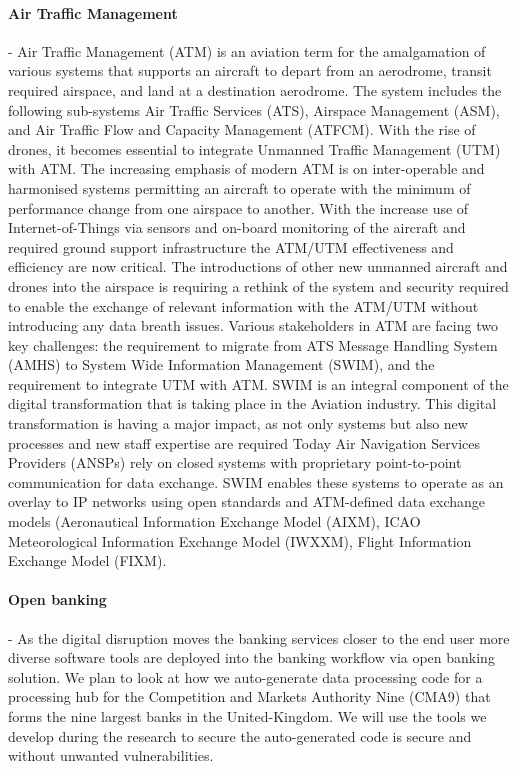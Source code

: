 \documentclass[a4paper,11pt]{article}
\begin{document}
\paragraph{Air Traffic Management}
\label{sec:atm}
- Air Traffic Management (ATM) is an aviation term for the amalgamation of various systems that supports an aircraft to depart from an aerodrome, transit required airspace, and land at a destination aerodrome. The system includes the following sub-systems Air Traffic Services (ATS), Airspace Management (ASM), and Air Traffic Flow and Capacity Management (ATFCM). With the rise of drones, it becomes essential to integrate Unmanned Traffic Management (UTM) with ATM. The increasing emphasis of modern ATM is on inter-operable and harmonised systems permitting an aircraft to operate with the minimum of performance change from one airspace to another. With the increase use of Internet-of-Things via sensors and on-board monitoring of the aircraft and required ground support infrastructure the ATM/UTM effectiveness and efficiency are now critical. The introductions of other new unmanned aircraft and drones into the airspace is requiring a rethink of the system and security required to enable the exchange of relevant information with the ATM/UTM without introducing any data breath issues. 
Various stakeholders in ATM are facing two key challenges: the requirement to migrate from ATS Message Handling System (AMHS) to System Wide Information Management (SWIM), and the requirement to integrate UTM with ATM. SWIM is an integral component of the digital transformation that is taking place in the Aviation industry. This digital transformation is having a major impact, as not only systems but also new processes and new staff expertise are required Today Air Navigation Services Providers (ANSPs) rely on closed systems with proprietary point-to-point communication for data exchange. SWIM enables these systems to operate as an overlay to IP networks using open standards and ATM-defined data exchange models (Aeronautical Information Exchange Model (AIXM), ICAO Meteorological Information Exchange Model (IWXXM), Flight Information Exchange Model (FIXM). 

\paragraph{Open banking}
\label{sec:banking}
- As the digital disruption moves the banking services closer to the end user more diverse software tools are deployed into the banking workflow via open banking solution. We plan to look at how we auto-generate data processing code for a processing hub for the Competition and Markets Authority Nine (CMA9) that forms the nine largest banks in the United-Kingdom. We will use the tools we develop during the research to secure the auto-generated code is secure and without unwanted vulnerabilities.
\end{document}
